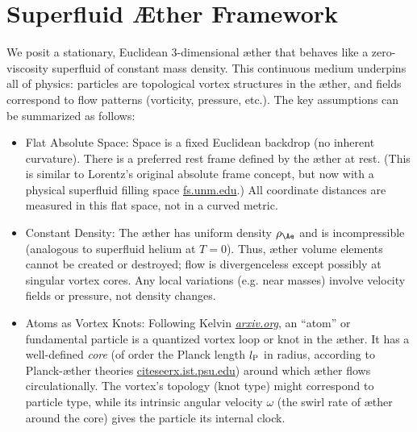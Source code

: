 \documentclass[aps,preprint,superscriptaddress]{revtex4}
\begin{document}
    \section*{Superfluid Æther Framework}

    We posit a stationary, Euclidean 3-dimensional æther that behaves like a zero-viscosity superfluid of constant mass density. This continuous medium underpins all of physics: particles are topological vortex structures in the æther, and fields correspond to flow patterns (vorticity, pressure, etc.). The key assumptions can be summarized as follows:

    \begin{itemize}
        \item
        Flat Absolute Space: Space is a fixed Euclidean backdrop (no inherent curvature). There is a preferred rest frame defined by the æther at rest. (This is similar to Lorentz’s original absolute frame concept, but now with a physical superfluid filling space
        \href{https://fs.unm.edu/QuantizationDiscretization.pdf#:~:text=Winterberg%20,an%20equal%20number%20of%20positive}{fs.unm.edu}.) All coordinate distances are measured in this flat space, not in a curved metric.

        \item
        Constant Density: The æther has uniform density $\rho_{\Ae}$ and is incompressible (analogous to superfluid helium at $T=0$). Thus, æther volume elements cannot be created or destroyed; flow is divergenceless except possibly at singular vortex cores. Any local variations (e.g. near masses) involve velocity fields or pressure, not density changes.

        \item
        Atoms as Vortex Knots: Following Kelvin
        \href{https://arxiv.org/pdf/2012.07395#:~:text=Thomson%20,on%20the%20right%20path%20when}{\textit{arxiv.org}}, an “atom” or fundamental particle is a quantized vortex loop or knot in the æther. It has a well-defined \textit{core} (of order the Planck length $l_{\rm P}$ in radius, according to Planck-æther theories
        \href{https://citeseerx.ist.psu.edu/document?repid=rep1&type=pdf&doi=25483f1ebc9dc442a9f1505a49d96eb35e92e3f4#:~:text=45,on%20General%20Relativity%20and%20Relativistic}{citeseerx.ist.psu.edu}) around which æther flows circulationally. The vortex’s topology (knot type) might correspond to particle type, while its intrinsic angular velocity $\omega$ (the swirl rate of æther around the core) gives the particle its internal clock.


\end{itemize}
\end{document}
